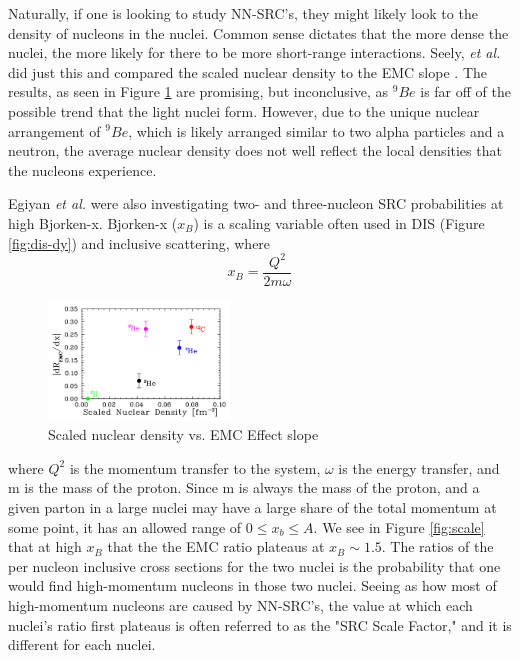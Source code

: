 \documentclass[11pt]{article}
\begin{document}
Naturally, if one is looking to study NN-SRC's, they might likely look to the density of nucleons in the nuclei.  Common sense dictates that the more dense the nuclei, the more likely for there to be more short-range interactions.  Seely, \emph{et al.} did just this and compared the scaled nuclear density to the EMC slope \cite{Seely:2009gt}. The results, as seen in Figure \ref{fig:density} are promising, but inconclusive, as $^9Be$ is far off of the possible trend that the light nuclei form.  However, due to the unique nuclear arrangement of $^9Be$, which is likely arranged similar to two alpha particles and a neutron, the average nuclear density does not well reflect the local densities that the nucleons experience.

Egiyan \emph{et al.} were also investigating two- and three-nucleon SRC probabilities at high Bjorken-x. Bjorken-x ($x_B$) is a scaling variable often used in DIS  (Figure \ref{fig:dis-dy}) and inclusive scattering, where 
\begin{equation}
	x_B = \frac{Q^2}{2m\omega}
\end{equation}

\begin{figure}
  \begin{center}
    \includegraphics[width=0.43\textwidth]{density.png}
  \end{center}
  \caption{Scaled nuclear density vs. EMC Effect slope \cite{Seely:2009gt}}
  \label{fig:density}
\end{figure}

where $Q^2$ is the momentum transfer to the system, $\omega$ is the energy transfer, and m is the mass of the proton. Since m is always the mass of the proton, and a given parton in a large nuclei may have a large share of the total momentum at some point, it has an allowed range of $0\le x_b \le A$. We see in Figure \ref{fig:scale} that at high $x_B$ that the the EMC ratio plateaus at $x_B \sim 1.5$.  The ratios of the per nucleon inclusive cross sections for the two nuclei is the probability that one would find high-momentum nucleons in those two nuclei.  Seeing as how most of high-momentum nucleons are caused by NN-SRC's, the value at which each nuclei's ratio first plateaus is often referred to as the "SRC Scale Factor," and it is different for each nuclei.
\end{document}
